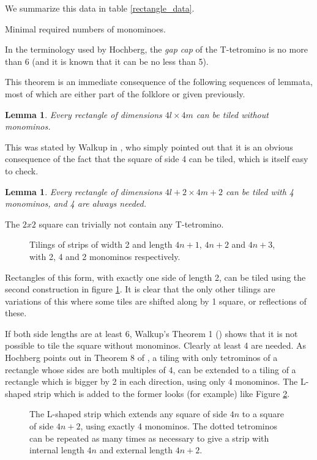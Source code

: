 \documentclass{article}
\theoremstyle{plain}
\newtheorem{lemma}[theorem]{Lemma}
\begin{document}
We summarize this data in table \ref{rectangle_data}.

\begin{table}

\caption{Minimal required numbers of monominoes.}
\end{table}

In the terminology used by Hochberg, the \emph{gap cap} of the T-tetromino is no more than 6 (and it is known that it can be no less than 5).

This theorem is an immediate consequence of the following sequences of lemmata, most of which are either part of the folklore or given previously.

\begin{lemma}
Every rectangle of dimensions $4l \times 4m$ can be tiled without monominos.
\end{lemma}
This was stated by Walkup in \cite{walkup}, who simply pointed out that it is an obvious consequence of the fact that the square of side 4 can be tiled, which is itself easy to check.

\begin{lemma}
Every rectangle of dimensions $4l + 2 \times 4m + 2$ can be tiled with 4 monominos, and 4 are always needed.
\end{lemma}
The $2x2$ square can trivially not contain any T-tetromino.

\begin{figure}

\caption{Tilings of strips of width 2 and length $4n + 1$, $4n+2$ and $4n+3$, with 2, 4 and 2 monominos respectively.}
\label{strips}
\end{figure}

Rectangles of this form, with exactly one side of length 2, can be tiled using the second construction in figure \ref{strips}. It is clear that the only other tilings are variations of this where some tiles are shifted along by 1 square, or reflections of these.

If both side lengths are at least $6$, Walkup's Theorem 1 (\cite{walkup}) shows that it is not possible to tile the square without monominos.
Clearly at least 4 are needed.
As Hochberg points out in Theorem 8 of \cite{hochberg}, a tiling with only tetrominos of a rectangle whose sides are both multiples of 4, can be extended to a tiling of a rectangle which is bigger by 2 in each direction, using only 4 monominos.
The L-shaped strip which is added to the former looks (for example) like Figure \ref{lshaped}.

\begin{figure}

\caption{The L-shaped strip which extends any square of side $4n$ to a square of side $4n+2$, using exactly 4 monominos. The dotted tetrominos can be repeated as many times as necessary to give a strip with internal length $4n$ and external length $4n + 2$.}
\label{lshaped}
\end{figure}
\end{document}
